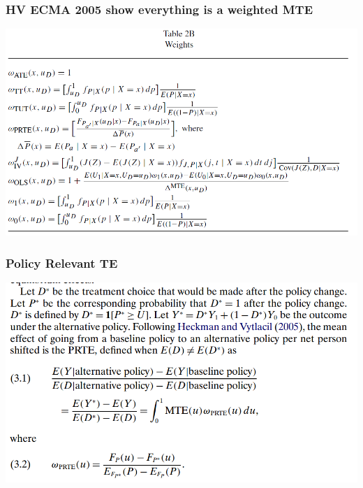 \begin{frame}
  \frametitle{HV ECMA 2005 show everything is a weighted MTE}
  \begin{center}
    \includegraphics[width=\textwidth]{./resources/HVWeights}
  \end{center}  
\end{frame}

\begin{frame}
  \frametitle{Policy Relevant TE}
  \begin{center}
    \includegraphics[width=\textwidth]{./resources/HVPRTE}
  \end{center}  
\end{frame}

